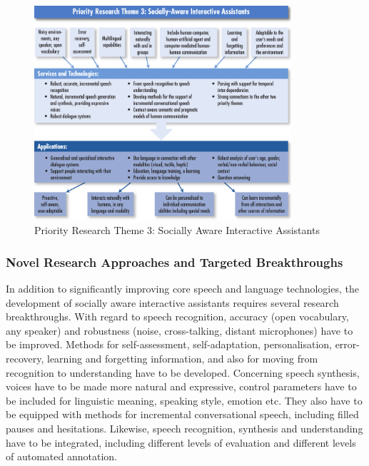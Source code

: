 \documentclass[10pt, plain]{../../metanetpaper}
\begin{document}
\begin{multicols}{2}
\begin{figure}[htb]
  \center
  \includegraphics[width=0.85\textwidth]{../_media/PT3}
  \caption{Priority Research Theme 3: Socially Aware Interactive Assistants}
  \label{fig:pt1-overview}
\end{figure}

\subsubsection{Novel Research Approaches and Targeted Breakthroughs}
\label{sec:novel-rese-appr-pt3}

In addition to significantly improving core speech and language technologies, the development of socially aware interactive assistants requires several research breakthroughs. With regard to speech recognition, accuracy (open vocabulary, any speaker) and robustness (noise, cross-talking, distant microphones) have to be improved. Methods for self-assessment, self-adaptation, personalisation, error-recovery, learning and forgetting information, and also for moving from recognition to understanding have to be developed. Concerning speech synthesis, voices have to be made more natural and expressive, control parameters have to be included for linguistic meaning, speaking style, emotion etc. They also have to be equipped with methods for incremental conversational speech, including filled pauses and hesitations. Likewise, speech recognition, synthesis and understanding have to be integrated, including different levels of evaluation and different levels of automated annotation.


\end{multicols}
\end{document}

